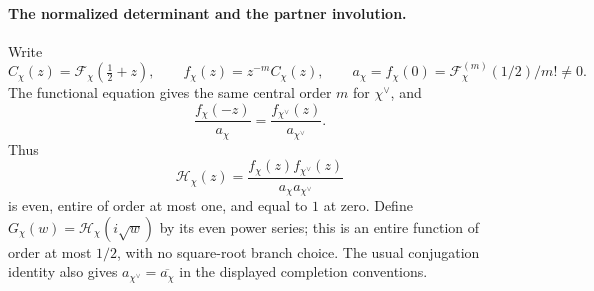 \paragraph{The normalized determinant and the partner involution.}
Write
\[
 C_\chi(z)=\mathcal F_\chi(\tfrac12+z),\qquad
 f_\chi(z)=z^{-m}C_\chi(z),\qquad
 a_\chi=f_\chi(0)=\mathcal F_\chi^{(m)}(1/2)/m!\ne0.
\]
The functional equation gives the same central order $m$ for $\chi^\vee$, and
\[
 \frac{f_\chi(-z)}{a_\chi}
 =\frac{f_{\chi^\vee}(z)}{a_{\chi^\vee}}.
\]
Thus
\[
 \mathcal H_\chi(z)=
 \frac{f_\chi(z)f_{\chi^\vee}(z)}{a_\chi a_{\chi^\vee}}
\]
is even, entire of order at most one, and equal to $1$ at zero. Define $G_\chi(w)=\mathcal H_\chi(i\sqrt w)$ by its even power series; this is an entire function of order at most $1/2$, with no square-root branch choice. The usual conjugation identity also gives $a_{\chi^\vee}=\overline{a_\chi}$ in the displayed completion conventions.

